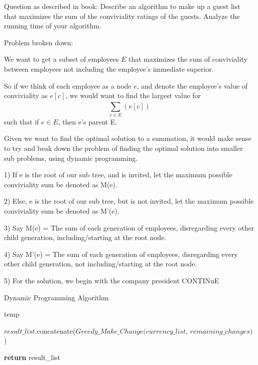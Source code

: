 \documentclass{article}
\begin{document}
Question as described in book: Describe an algorithm to make up a guest list that maximizes the sum of the conviviality ratings of the guests. Analyze the running time of your algorithm.

Problem broken down: 

We want to get a subset of employees $E$ that maximizes the sum of conviviality between employees not including the employee's immediate superior.

So if we think of each employee as a node $e$, and denote the employee's value of conviviality as $e[c]$, we would want to find the largest value for $$\sum_{e \in E}^{}(e[c])$$ such that if $e \in E$, then e's parent \notin E.


Given we want to find the optimal solution to a summation, it would make sense to try and beak down the problem of finding the optimal solution into smaller sub problems, using dynamic programming.

1) If e is the root of our sub tree, and is invited, let the maximum possible conviviality sum be denoted as M(e).

2) Else, e is the root of our sub tree, but is not invited, let the maximum possible conviviality sum be denoted as M'(e).

3) Say M(e) = The sum of each generation of employees, disregarding every other child generation, including/starting at the root node.

4) Say M'(e) = The sum of each generation of employees, disregarding every other child generation, not including/starting at the root node.

5) For the solution, we begin with the company president CONTINuE


\begin{algorithm}
    \caption{Dynamic Programming Algorithm}
    \begin{algorithmic}
            \State temp
            \EndIf
        \EndFor
        
        \State $result\_list$.concatenate($Greedy\_Make\_Change(currency\_list$, $remaining\_changes)$)
        
        \State \textbf{return} result\_list
        \EndProcedure
    \end{algorithmic}
\end{algorithm}
\end{document}
